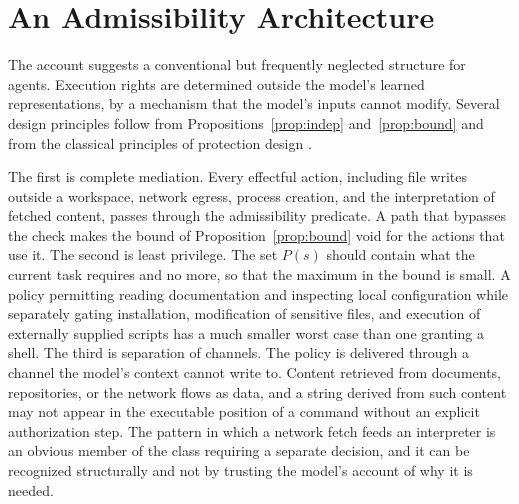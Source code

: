 \documentclass[11pt]{article}
\theoremstyle{definition}
\theoremstyle{remark}
\begin{document}
\section{An Admissibility Architecture}\label{sec:architecture}

The account suggests a conventional but frequently neglected structure for agents. Execution rights are determined outside the model's learned representations, by a mechanism that the model's inputs cannot modify. Several design principles follow from Propositions~\ref{prop:indep} and~\ref{prop:bound} and from the classical principles of protection design \cite{saltzer1975}.

The first is complete mediation. Every effectful action, including file writes outside a workspace, network egress, process creation, and the interpretation of fetched content, passes through the admissibility predicate. A path that bypasses the check makes the bound of Proposition~\ref{prop:bound} void for the actions that use it. The second is least privilege. The set $P(s)$ should contain what the current task requires and no more, so that the maximum in the bound is small. A policy permitting reading documentation and inspecting local configuration while separately gating installation, modification of sensitive files, and execution of externally supplied scripts has a much smaller worst case than one granting a shell. The third is separation of channels. The policy is delivered through a channel the model's context cannot write to. Content retrieved from documents, repositories, or the network flows as data, and a string derived from such content may not appear in the executable position of a command without an explicit authorization step. The pattern in which a network fetch feeds an interpreter is an obvious member of the class requiring a separate decision, and it can be recognized structurally and not by trusting the model's account of why it is needed.
\end{document}
